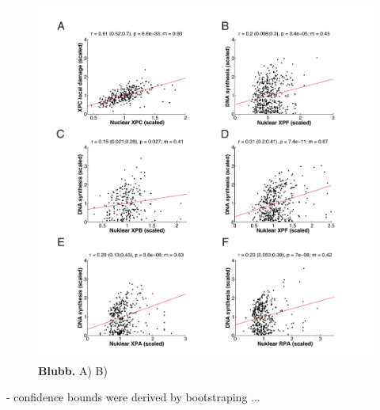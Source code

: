 \begin{figure}[htbp]
	\begin{center}
		\includegraphics[width=1\textwidth]{Abbildungen/figure3_3.pdf}
		\caption{\textbf{Blubb.} A) B) }
		\label{fig:Nuc_vs_DNAsynthesis}
	\end{center}
\end{figure}

- confidence bounds were derived by bootstraping ...

